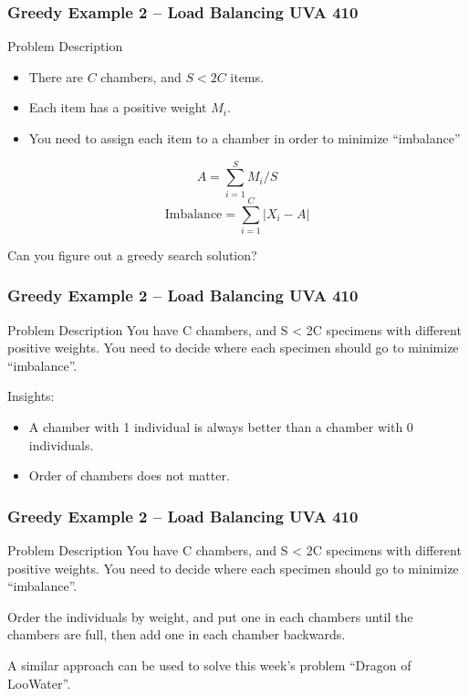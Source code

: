 \documentclass{beamer}
\begin{document}
\begin{frame}
  \frametitle{Greedy Example 2 -- Load Balancing UVA 410}

  \begin{block}{Problem Description}

    \begin{itemize}
    \item There are $C$ chambers, and $S < 2C$ items.
    \item Each item has a positive weight $M_i$.
    \item You need to assign each item to a chamber in order to minimize ``imbalance''
    \end{itemize}

    \begin{equation*}
      A = \sum^S_{i=1}M_i/S
    \end{equation*}
    \begin{equation*}
      \text{Imbalance} = \sum^C_{i=1} |X_i - A|
    \end{equation*}
  \end{block}


  Can you figure out a greedy search solution?
\end{frame}


\begin{frame}
  \frametitle{Greedy Example 2 -- Load Balancing UVA 410}

  \begin{block}{Problem Description}
  You have C chambers, and S < 2C specimens with different positive
  weights. You need to decide where each specimen should go to
  minimize ``imbalance''.
  \end{block}

  Insights:

  \begin{itemize}
  \item A chamber with 1 individual is always better than a chamber
    with 0 individuals.

    \medskip

  \item Order of chambers does not matter.
  \end{itemize}
\end{frame}

\begin{frame}
  \frametitle{Greedy Example 2 -- Load Balancing UVA 410}

  \begin{block}{Problem Description}
  You have C chambers, and S < 2C specimens with different positive
  weights. You need to decide where each specimen should go to
  minimize ``imbalance''.
  \end{block}

  \vfill

   Order the individuals by weight, and
  put one in each chambers until the chambers are full, then add one
  in each chamber backwards.

  \bigskip

  A similar approach can be used to solve this week's problem ``Dragon
  of LooWater''.
\end{frame}
\end{document}
